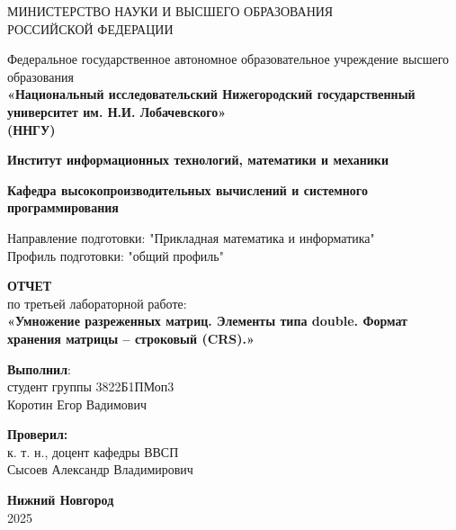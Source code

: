 \documentclass[a4paper,12pt]{article}
\begin{document}
\begin{titlepage}
\centering
{МИНИСТЕРСТВО НАУКИ И ВЫСШЕГО ОБРАЗОВАНИЯ\\
РОССИЙСКОЙ ФЕДЕРАЦИИ}

\vspace{1em}

Федеральное государственное автономное образовательное учреждение высшего образования\\
\textbf{«Национальный исследовательский Нижегородский государственный университет им. Н.И. Лобачевского»}\\
\textbf{(ННГУ)}

\vspace{2em}

\textbf{Институт информационных технологий, математики и механики}

\vspace{1em}

\textbf{Кафедра высокопроизводительных вычислений и системного программирования}

\vspace{2em}

Направление подготовки: "Прикладная математика и информатика"\\
Профиль подготовки: "общий профиль" \\

\vspace{4em}

\textbf{\Large ОТЧЕТ}\\
по третьей лабораторной работе:\\
\vspace{1em}
\textbf{«Умножение разреженных матриц. Элементы типа double. Формат хранения матрицы – строковый (CRS).»}

\begin{flushright}
\textbf{Выполнил}:\\[5pt]
студент группы {3822Б1ПМоп3} \\[1em]
{Коротин Егор Вадимович}
\end{flushright}

\vspace{1em}

\begin{flushright}
\noindent\textbf{Проверил:} \\[5pt]
к. т. н., доцент кафедры ВВСП \\[5pt]
{Сысоев Александр Владимирович}
\end{flushright}

\vspace{1em}

\vfill
\textbf{Нижний Новгород}\\
2025
\end{titlepage}
\end{document}
